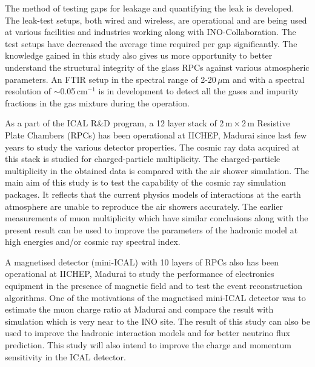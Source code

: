 \documentclass[a4paper,12pt,twoside]{article}
\begin{document}
The method of testing gaps for leakage and quantifying the leak is developed. The leak-test setups, both wired and wireless, are operational and are being used at various facilities and industries working along with INO-Collaboration. The test setups have decreased the average time required per gap significantly. The knowledge gained in this study also gives us more opportunity to better understand the structural integrity of the glass RPCs against various atmospheric parameters. An FTIR setup in the spectral range of \mbox{2-20\,$\mu$m} and with a spectral resolution of \mbox{$\sim$0.05\,cm$^{-1}$} is in development to detect all the gases and impurity fractions in the gas mixture during the operation.

As a part of the ICAL R\&D program, a 12 layer stack of 2\,m\,$\times$\,2\,m Resistive Plate Chambers (RPCs) has been operational at IICHEP, Madurai since last few years to study the various detector properties. The cosmic ray data acquired at this stack is studied for charged-particle multiplicity. The charged-particle multiplicity in the obtained data is compared with the air shower simulation. The main aim of this study is to test the capability of the cosmic ray simulation packages. It reflects that the current physics models of interactions at the earth atmosphere are unable to reproduce the air showers accurately. The earlier measurements of muon multiplicity which have similar conclusions along with the present result can be used to improve the parameters of the hadronic model at high energies and/or cosmic ray spectral index.

A magnetised detector (mini-ICAL) with 10 layers of RPCs also has been operational at IICHEP, Madurai to study the performance of electronics equipment in the presence of magnetic field and to test the event reconstruction algorithms. One of the motivations of the magnetised mini-ICAL detector was to estimate the muon charge ratio at Madurai and compare the result with simulation which is very near to the INO site. The result of this study can also be used to improve the hadronic interaction models and for better neutrino flux prediction. This study will also intend to improve the charge and momentum sensitivity in the ICAL detector.

\end{document}
